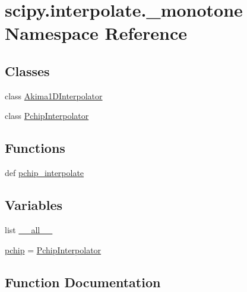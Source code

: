 \hypertarget{namespacescipy_1_1interpolate_1_1__monotone}{}\section{scipy.\+interpolate.\+\_\+monotone Namespace Reference}
\label{namespacescipy_1_1interpolate_1_1__monotone}
\subsection*{Classes}
\begin{DoxyCompactItemize}
\item 
class \hyperlink{classscipy_1_1interpolate_1_1__monotone_1_1Akima1DInterpolator}{Akima1\+D\+Interpolator}
\item 
class \hyperlink{classscipy_1_1interpolate_1_1__monotone_1_1PchipInterpolator}{Pchip\+Interpolator}
\end{DoxyCompactItemize}
\subsection*{Functions}
\begin{DoxyCompactItemize}
\item 
def \hyperlink{namespacescipy_1_1interpolate_1_1__monotone_aa34806539957bb18e451b95e11b96f47}{pchip\+\_\+interpolate}
\end{DoxyCompactItemize}
\subsection*{Variables}
\begin{DoxyCompactItemize}
\item 
list \hyperlink{namespacescipy_1_1interpolate_1_1__monotone_a995fd4ce36ab357b2cddfa78d1271084}{\+\_\+\+\_\+all\+\_\+\+\_\+}
\item 
\hyperlink{namespacescipy_1_1interpolate_1_1__monotone_a3130a2af208814c3fea4cd27df32485f}{pchip} = \hyperlink{classscipy_1_1interpolate_1_1__monotone_1_1PchipInterpolator}{Pchip\+Interpolator}
\end{DoxyCompactItemize}


\subsection{Function Documentation}
\hypertarget{namespacescipy_1_1interpolate_1_1__monotone_aa34806539957bb18e451b95e11b96f47}{}
